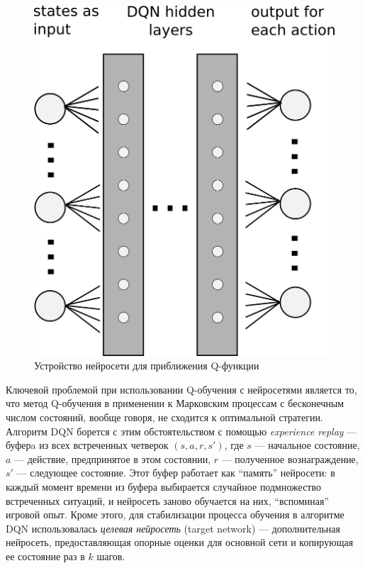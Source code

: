 \documentclass[specification, annotation]{itmo-student-thesis}
\begin{document}
\begin{figure}[!h]
  \caption{Устройство нейросети для приближения Q-функции}\label{dqn-scheme}
  \centering
  \includegraphics{dqn-scheme}
\end{figure}

Ключевой проблемой при использовании Q-обучения с нейросетями является то, что
метод Q-обучения в применении к Марковским процессам с бесконечным числом
состояний, вообще говоря, не сходится к оптимальной стратегии. Алгоритм DQN
борется с этим обстоятельством с помощью \textit{experience replay} --- буферa
из всех встреченных четверок $(s, a, r, s')$, где $s$ ---
начальное состояние, $a$ --- действие, предпринятое в этом состоянии, $r$ ---
полученное вознаграждение, $s'$ --- следующее состояние. Этот буфер работает как
``память'' нейросети: в каждый момент времени из буфера выбирается случайное
подмножество встреченных ситуаций, и нейросеть заново обучается на них,
``вспоминая'' игровой опыт. Кроме этого, для стабилизации процесса обучения в
алгоритме DQN использовалась \textit{целевая нейросеть} (target network) ---
дополнительная нейросеть, предоставляющая опорные оценки для основной сети и
копирующая ее состояние раз в $k$ шагов.
\end{document}
